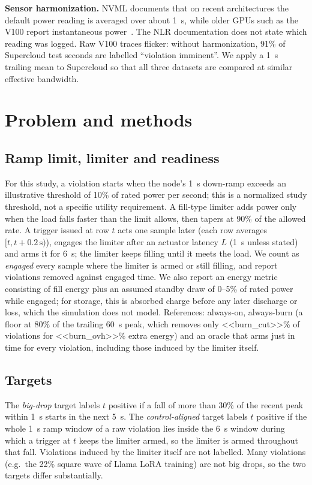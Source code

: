 \documentclass[conference]{IEEEtran}
\begin{document}
\textbf{Sensor harmonization.} NVML documents that on recent architectures the default power reading is
averaged over about 1~s, while older GPUs such as the V100 report instantaneous power~\cite{nvml}. The NLR
documentation does not state which reading was logged. Raw V100 traces flicker: without harmonization,
91\% of Supercloud test seconds are labelled ``violation imminent''. We apply a 1~s trailing mean to
Supercloud so that all three datasets are compared at similar effective bandwidth.

\section{Problem and methods}
\subsection{Ramp limit, limiter and readiness}
For this study, a violation starts when the node's 1~s down-ramp exceeds an illustrative threshold of
10\% of rated power per second; this is a normalized study threshold, not a specific utility requirement. A fill-type limiter adds
power only when the load falls faster than the limit allows, then tapers at 90\% of the allowed rate. A trigger
issued at row $t$ acts one sample later (each row averages $[t, t{+}0.2\,\mathrm{s})$), engages the
limiter after an actuator latency $L$ (1~s unless stated) and arms it for 6~s; the limiter keeps
filling until it meets the load. We count as \emph{engaged} every sample where the limiter is armed or
still filling, and report violations removed against engaged time. We also report an energy metric
consisting of fill energy plus an assumed standby draw of 0--5\% of rated power while engaged; for
storage, this is absorbed charge before any later discharge or loss, which the simulation does not model. References: always-on, always-burn (a floor at 80\% of the trailing 60~s peak,
which removes only <<burn_cut>>\% of violations for <<burn_ovh>>\% extra energy) and an oracle that
arms just in time for every violation, including those induced by the limiter itself.

\subsection{Targets}
The \emph{big-drop} target labels $t$ positive if a fall of more than 30\% of the recent peak within
1~s starts in the next 5~s. The \emph{control-aligned} target labels $t$ positive if the whole 1~s ramp window
of a raw violation lies inside the 6~s window during which a trigger at $t$ keeps the limiter armed, so
the limiter is armed throughout that fall. Violations induced by the limiter itself are not labelled.
Many violations (e.g.\ the 22\% square wave of Llama LoRA training) are not big drops, so the two
targets differ substantially.
\end{document}
